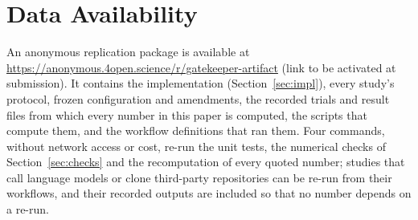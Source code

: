 \documentclass[acmsmall,screen,review,anonymous]{acmart}
\theoremstyle{acmdefinition}
\begin{document}
\maketitle











\section*{Data Availability}
An anonymous replication package is available at \url{https://anonymous.4open.science/r/gatekeeper-artifact} (link to be
activated at submission).  It contains the implementation (Section~\ref{sec:impl}), every study's protocol, frozen configuration
and amendments, the recorded trials and result files from which every number in this paper is computed, the scripts that compute
them, and the workflow definitions that ran them.  Four commands, without network access or cost, re-run the unit tests, the numerical checks of
Section~\ref{sec:checks} and the recomputation of every quoted number; studies that call language models or clone third-party
repositories can be re-run from their workflows, and their recorded outputs are included so that no number depends on a re-run.


\end{document}
